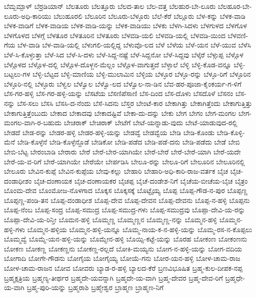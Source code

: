 {ಬೆಮ್ಬಮ್ಪಾಳ್
ಬೆರ್ರಡಿಯಾನ್
ಬೆಲತೂರು
ಬೆಲತ್ತೂರು
ಬೆಲದ-ತಾಲ
ಬೆಲ-ವತ್ತ
ಬೆಲಹುರ-ಬೇ-ಲೂರು
ಬೆಲಹೂರ-ಬೇ-ಲೂರು-ಅಧಿ-ಕಾರಿಯು
ಬೆಲುಹೂರಲಿ
ಬೆಲೂರಿನ
ಬೆಲೂರು-ಬೆಳ್ಳೂರು
ಬೆಲೆ-ಕೆರೆ
ಬೆಲ್ಲೂರು
ಬೆಳ-ಕನ್ನು
ಬೆಳಕ-ವಾಡಿ
ಬೆಳಕ-ವಾಡಿಗೆ
ಬೆಳಕ-ವಾಡಿಯ
ಬೆಳಕ-ವಾಡಿ-ಯನ್ನು
ಬೆಳಕ-ವಾಡಿಯು
ಬೆಳಕು
ಬೆಳಗಿ-ಸಿದಳು
ಬೆಳಗುಳದ
ಬೆಳಗೊಳ
ಬೆಳಗೊಳದ
ಬೆಳಗ್ಗೆ
ಬೆಳತೂರ
ಬೆಳತೂರಿನ
ಬೆಳತೂರು
ಬೆಳವಡಿ-ಯಲಿ
ಬೆಳವಡಿ-ಯಲ್ಲಿ
ಬೆಳವಡಿ-ಯಿಂದ
ಬೆಳವಣಿ-ಗೆಯ
ಬೆಳ-ವಾಡಿ
ಬೆಳ-ವಾಡಿ-ಯಲ್ಲಿ
ಬೆಳುಗಲಿ-ಯಲ್ಲಿದ್ದ
ಬೆಳುವೊ-ಲದ
ಬೆಳೆ
ಬೆಳೆಯ
ಬೆಳೆ-ಯನ
ಬೆಳೆ-ಯುವ
ಬೆಳೆಸಿ
ಬೆಳೆ-ಸಿ-ಕೊಳ್ಳುತ್ತಾ
ಬೆಳೆ-ಸಿದ
ಬೆಳೆ-ಸಿ-ದಳು
ಬೆಳೆ-ಸಿದ್ದ-ನಷ್ಟೆ
ಬೆಳೆ-ಸಿದ್ದನೋ
ಬೆಳೆ-ಸಿದ್ದವು
ಬೆಳ್ಕೆರೆ
ಬೆಳ್ಗುಪ್ಪ
ಬೆಳ್ಗೊಳ
ಬೆಳ್ಗೊಳದ
ಬೆಳ್ಗೊಳ-ದಲ್ಲಿ
ಬೆಳ್ಗೊಳ-ದೊಳ್ಜನ-ಮೆಲ್ಲಂ
ಬೆಳ್ಗೊಳ-ವಾಗುತ್ತದೆ
ಬೆಳ್ಳಾಲೆ
ಬೆಳ್ಳಿ
ಬೆಳ್ಳಿ-ಕೊಡ-ವನ್ನೂ
ಬೆಳ್ಳಿ-ಬಟ್ಟಲು-ಗಳ
ಬೆಳ್ಳಿ-ಬೆಟ್ಟದ
ಬೆಳ್ಳಿ-ಮಾಣಿಯ
ಬೆಳ್ಳಿ-ಮುಲಾಮಿನ
ಬೆಳ್ಳಿಯ
ಬೆಳ್ಳೂರ
ಬೆಳ್ಳೂ-ರನ್ನು
ಬೆಳ್ಳೂ-ರಿಗೆ
ಬೆಳ್ಳೂರಿನ
ಬೆಳ್ಳೂರಿ-ನಲ್ಲಿ
ಬೆಳ್ಳೂರು
ಬೆಳ್ವಲ
ಬೆಳ್ವೊಲ
ಬೆಳ್ವೊ-ಲದ
ಬೆಳ್ವೊಲ-ನಾ-ಡಿನ
ಬೆವ-ಹರ-ಪೂಜಾ-ಕೈಂಕರ್ಯ-ಗ-ಳಿಗೆ
ಬೆಸ-ಗರ-ಹಳ್ಳಿ
ಬೆಸ-ಗರ-ಹಳ್ಳಿ-ಯನ್ನು
ಬೆಸಟೆಯ
ಬೆಸಣಿಪೆಸಾಣಿ
ಬೆಸ-ದಿಂದ
ಬೆಸ-ದೊಳು
ಬೆಸದೊಳೆ
ಬೆಸನಂ
ಬೆಸ-ನನ್ನು
ಬೆಸ-ಸಲು
ಬೆಸಸಿ
ಬೆಸಸಿ-ದ-ನೆಂದು
ಬೆಸೆ-ಸಿದನು
ಬೆಸ್ತರ
ಬೇಂಟೆ-ಕಾರ
ಬೇಕಾಗಿತ್ತು
ಬೇಕಾಗಿತ್ತೆಂದು
ಬೇಕಾಗುತ್ತಿತ್ತು
ಬೇಕಾಗುತ್ತಿತ್ತೆಂಬುದು
ಬೇಕಾದ
ಬೇಕಾದವು
ಬೇಕಾದಷ್ಟಿವೆ
ಬೇಕಾ-ದು-ದನ್ನು
ಬೇಕು
ಬೇಗ
ಬೇಗಂ
ಬೇಗ-ಮಂಗಲ
ಬೇಗ-ಮಂಗಲ-ವಾಗಿ-ರ-ಬಹುದು
ಬೇಚರಾಕ್
ಬೇಚಿರಾಕ್
ಬೇಟೆಗೆ
ಬೇಟೆ-ಯನ್ನಾಡು-ವುದು
ಬೇಟೆ-ಯಾಡುವುದ-ರಲ್ಲಿ
ಬೇಡದೆ
ಬೇಡ-ರನ್ನು
ಬೇಡರ-ಹಳ್ಳಿ
ಬೇಡರ-ಹಳ್ಳಿ-ಯನ್ನು
ಬೇಡವ್ವೆ
ಬೇಡವ್ವೆಯ
ಬೇಡಿ
ಬೇಡಿ-ಕೊಂಡು
ಬೇಡಿ-ಕೊಳ್ಳಿ-ಮೆನೆ
ಬೇಡಿ-ಕೊಳ್ಳೆನೆ
ಬೇಡಿ-ಕೊಳ್ಳೆನ್ದೊಡೆ
ಬೇಡಿಕೋ
ಬೇಡಿ-ಪಡೆದ
ಬೇಡಿ-ಪಡೆ-ದನು
ಬೇಡಿ-ಪಡೆದು
ಬೇಡೆ
ಬೇಬಿ
ಬೇಬಿ-ಬೆಟ್ಟ
ಬೇರಂಬಾಡಿ
ಬೇರಾರು
ಬೇರೆ
ಬೇರೆ-ಬೇರ-ಯಾಗಿಯೇ
ಬೇರೆ-ಬೇರೆ
ಬೇರೆ-ಬೇರೆ-ಯಾಗಿ
ಬೇರೆ-ಯದೇ
ಬೇರೆ-ಯ-ವ-ರಿಗೆ
ಬೇರೆ-ಯಾಗಿಯೇ
ಬೇರೆಯೇ
ಬೇರ್ಪಡಿಸಿ
ಬೇಲೂ-ರನ್ನು
ಬೇಲೂ-ರಿಗೆ
ಬೇಲೂರಿನ
ಬೇಲೂರಿನಲ್ಲಿ
ಬೇಲೂರು
ಬೇವಿನ-ಕುಪ್ಪೆ
ಬೇವಿನ-ಕುಪ್ಪೆಯ
ಬೇವು-ಕಲ್ಲು
ಬೇಹಾರಿ
ಬೇಹಾರಿ-ಅಧಿ-ಕಾರಿ-ರಾಜ-ವರ್ತಕ
ಬೈಚ
ಬೈಚ-ದಂಡಾಧೀಶಂ
ಬೈಚ-ದಂಣಾಯಕ
ಬೈಚ-ದಂಣಾಯಕರ
ಬೈಚಪ್ಪ
ಬೈಚೆ-ದಂಡೇಶ-ನಿಗೆ
ಬೈಚೆಯ-ಬೀಚೆಯ-ಬೈಚ
ಬೈತ್ರಂ
ಬೊಂಮ-ದೇವ
ಬೊಂಮೋಜ-ನೊಳಗಾದ
ಬೊಕ್ಕಸ
ಬೊಕ್ಕಸಕ್ಕೆ
ಬೊಟ್ಟೈಯ್ಯ
ಬೊಪ್ಪ
ಬೊಪ್ಪ-ಗೌಡ-ನ-ಪುರ
ಬೊಪ್ಪಣ್ಣ
ಬೊಪ್ಪಣ್ಣ-ಪಂಡಿ-ತನ
ಬೊಪ್ಪ-ದಂಡಾಧೀಶ
ಬೊಪ್ಪ-ದೇವ
ಬೊಪ್ಪ-ದೇವನ
ಬೊಪ್ಪ-ದೇವನು
ಬೊಪ್ಪ-ನ-ಹಳ್ಳಿ
ಬೊಪ್ಪನು
ಬೊಪ್ಪ-ನೆಂಬ
ಬೊಪ್ಪ-ಸಂದ್ರ
ಬೊಪ್ಪ-ಸಮುದ್ರ
ಬೊಪ್ಪ-ಸಮುದ್ರ-ಗಳು
ಬೊಪ್ಪ-ಸಮುದ್ರವು
ಬೊಪ್ಪಾ-ದೇವಿ-ಯ-ರನ್ನು
ಬೊಪ್ಪಾ-ದೇವಿ-ಯ-ರಿನ್ತೀ
ಬೊಮನ-ಹಳ್ಳಿ
ಬೊಮ್ಮಣ್ಣ
ಬೊಮ್ಮಣ್ಣನ
ಬೊಮ್ಮಣ್ಣ-ನನ್ನು
ಬೊಮ್ಮನ-ಹಳ್ಳಿ
ಬೊಮ್ಮನ-ಹಳ್ಳಿ-ಗಳು
ಬೊಮ್ಮನ-ಹಳ್ಳಿಯ
ಬೊಮ್ಮನ-ಹಳ್ಳಿ-ಯನ್ನೂ
ಬೊಮ್ಮ-ನಾಯ-ಕ-ನ-ಹಳ್ಳಿ-ಯನ್ನು
ಬೊಮ್ಮ-ರಸ-ನ-ಕೊಪ್ಪಲು
ಬೊಮ್ಮವ್ವೆ
ಬೊಮ್ಮೆ-ಯನ-ಹಳ್ಳಿ-ಯನ್ನು
ಬೊಮ್ಮೇನ-ಹಳ್ಳಿ
ಬೊಯ್ಸಿ-ಕಟ್ಟೆ-ಯನ್ನು
ಬೊರಹ
ಬೋಕಂಣ
ಬೋಕಂಣನು
ಬೋಕಣ
ಬೋಕಣ್ಣ
ಬೋಕಣ್ಣನು
ಬೋಕಣ್ಣ-ರಲ್ಲದೆ
ಬೋಕಿ-ಮಯ್ಯನು
ಬೋಗ-ನ-ಹಳ್ಳಿ-ಯನ್ನು
ಬೋಗ-ವದಿಯ
ಬೋಗಾದಿ
ಬೋಗೇ-ಗೌಡನು
ಬೋಗೈಯ
ಬೋಗೈಯ್ಯ
ಬೋಯೆ-ಗನು
ಬೋರ-ಯನ-ಹಳ್ಳಿ
ಬೋಳ-ಚಾಮ-ರಾಜ
ಬೋಳ-ಚಾಮ-ರಾಜನ
ಬೋವ
ಬೋವರು
ಬ್ಯಾಡ-ರ-ಹಳ್ಳಿ
ಬ್ಯಾಲದ-ಕೆರೆ
ಬ್ರಣವಿಭೂಷಿತ
ಬ್ರಹ್ಮ-ಕುಲ-ದೀಪಕ-ನಪ್ಪ
ಬ್ರಹ್ಮಕ್ಷತ್ರಿಯ
ಬ್ರಹ್ಮಣ್ಯ-ತೀರ್ಥರ
ಬ್ರಹ್ಮದೇ-ಯವನ್ನಾಗಿ
ಬ್ರಹ್ಮದೇ-ಯ-ವಾಗಿ
ಬ್ರಹ್ಮ-ದೇವರ
ಬ್ರಹ್ಮ-ದೇವ-ರಿಗೆ
ಬ್ರಹ್ಮಧೇ-ಯ-ವಾಗಿ
ಬ್ರಹ್ಮ-ಪುರಿ-ಯನ್ನು
ಬ್ರಹ್ಮರಾಶಿ
ಬ್ರಹ್ಮೇಶ್ವರ
ಬ್ರಾಹ್ಮಣ
ಬ್ರಾಹ್ಮಣ-ನಿಗೆ
}
